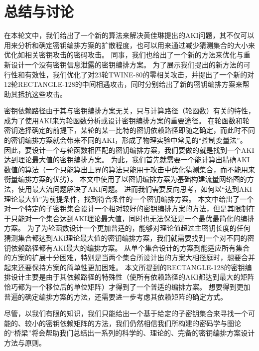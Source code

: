 
\chapter{总结与讨论}
\label{chap:Con}
在本轮文中，我们给出了一个新的算法来解决黄佳琳提出的AKI问题，其不仅可以用来分析和确定密钥编排方案的扩散程度，也可以用来通过减少猜测集合的大小来优化如相关密钥攻击的密码攻击。
同事，我们也给出了一个新的方法来优化与重新设计一个没有密钥信息泄露的密钥编排方案。
为了展示我们提出的新方法的可行性和有效性，我们优化了对23轮TWINE-80的零相关攻击，并提出了一个新的对12轮RECTANGLE-128的中间相遇攻击，同时分别给出了新的密钥编排方案来帮助其抵抗这些攻击。

密钥依赖路径由于其与密钥编排方案无关，只与计算路径（轮函数）有关的特性，成为了使用AKI来为轮函数分析或设计密钥编排方案的重要途径。
在轮函数和轮密钥选择确定的前提下，某轮的某一比特的密钥依赖路径即随之确定，而此时不同的密钥编排方案就会带来不同的AKI，形成了物理实验中常见的“控制变量法”。
因此，要设计一个与轮函数相匹配的密钥编排方案，我们要做的就是找到一个AKI达到理论最大值的密钥编排方案。
为此，我们首先就需要一个能计算出精确AKI数值的算法（一个只能算出上界的算法只能用于攻击中优化猜测集合，而不能用来衡量编排方案的优劣）。
本文中使用了以密钥编排方案为基础构建流量网络图的方法，使用最大流问题解决了AKI问题。
进而我们需要反向思考，如何以“达到AKI理论最大值”为前提条件，找到符合条件的一个密钥编排方案。
本文中给出了一个对一个特定的子密钥集合设计一个相对较好的密钥编排方案的方法，但是其限制在于只能对一个集合达到AKI理论最大值，同时也无法保证是一个最优最简化的编排方案。
为了为轮函数设计一个更加普适的，能够对理论值超过主密钥长度的任何猜测集合都达到AKI理论最大值的密钥编排方案，我们就需要找到一个对不同的密钥依赖路径都有AKI最大的编排方案。
从单个集合设计的方案到能适应所有集合的方案的扩展十分困难，特别是当两个集合所设计出的方案大相径庭时，想要合并起来还要保持方案的简单性更加困难。
本文所提到的RECTANGLE-128的密钥编排设计主要是由于其依赖路径的特殊性（使所有依赖路径的AKI都达到最大的矩阵恰巧都为一个移位后的单位矩阵）才得到了一个普适的编排方案。
想要得到更加普遍的确定编排方案的方法，还需要进一步考虑其依赖矩阵的确定方式。

尽管，以我们有限的知识，我们只能给出一个基于给定的子密钥集合来寻找一个可能的、较小的密钥依赖矩阵的方法，我们仍然相信我们所构建的密码学与图论的“桥梁”将会帮助我们总结出一系列的科学的、理论的、完备的密钥编排方案设计方法与原则。
